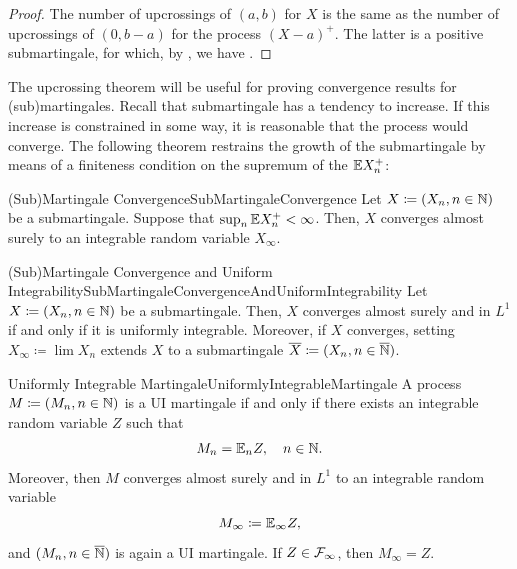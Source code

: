 \begin{proof}
	The number of upcrossings of $(a, b)$ for $X$ is the same as the number of upcrossings of $(0, b - a)$ for the process $(X - a)^+$. The latter is a positive submartingale, for which, by , we have .
\end{proof}

The upcrossing theorem will be useful for proving convergence results for (sub)martingales. Recall that submartingale has a tendency to increase. If this increase is constrained in some way, it is reasonable that the process would converge. The following theorem restrains the growth of the submartingale by means of a finiteness condition on the supremum of the $\mathbb{E} X_n^+$:

\begin{thm}{(Sub)Martingale Convergence}{SubMartingaleConvergence}
	Let $X \coloneqq (X_n, n \in \mathbb{N})$ be a submartingale. Suppose that $\sup_n \mathbb{E} X_n^+ < \infty$. Then, $X$ converges almost surely to an integrable random variable $X_\infty$.
\end{thm}

\begin{thm}{(Sub)Martingale Convergence and Uniform Integrability}{SubMartingaleConvergenceAndUniformIntegrability}
	Let $X \coloneqq (X_n, n \in \mathbb{N})$ be a submartingale. Then, $X$ converges almost surely and in $L^1$ if and only if it is uniformly integrable. Moreover, if $X$ converges, setting $X_\infty \coloneqq \lim X_n$ extends $X$ to a submartingale $\overline{X} \coloneqq (X_n, n \in \overline{\mathbb{N}})$.
\end{thm}

\begin{thm}{Uniformly Integrable Martingale}{UniformlyIntegrableMartingale}
	A process $M \coloneqq (M_n, n \in \mathbb{N})$ is a UI martingale if and only if there exists an integrable random variable $Z$ such that
	\begin{equation}\label{eq:UIMartingaleDef}
		M_n = \mathbb{E}_n Z, \quad n \in \mathbb{N}.
	\end{equation}
	Moreover, then $M$ converges almost surely and in $L^1$ to an integrable random variable
	\begin{equation}\label{eq:MartingaleLimit}
		M_\infty \coloneqq \mathbb{E}_\infty Z,
	\end{equation}
	and $(M_n, n \in \overline{\mathbb{N}})$ is again a UI martingale. If $Z \in \mathcal{F}_\infty$, then $M_\infty = Z$.
\end{thm}

